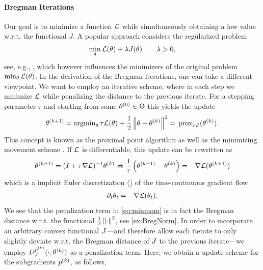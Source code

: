 \paragraph{Bregman Iterations} Our goal is to minimize a function $\mathcal{L}$ while simultaneously obtaining a low value w.r.t. the functional $J$. A popular approach considers the regularized problem
%
\begin{align*}
\min_\theta \mathcal{L}(\theta) + \lambda J(\theta)\qquad \lambda>0,
\end{align*}
%
see, e.g., \cite{tikhonov1943stability, combettes2008proximal,daubechies2004iterative,fadili2006sparse,figueiredo2007gradient,chambolle2004algorithm,chambolle2011first}, which however influences the minimizers of the original problem $\min_\theta \mathcal{L}(\theta)$. In the derivation of the Bregman iterations, one can take a different viewpoint. We want to employ an iterative scheme, where in each step we minimize $\mathcal{L}$ while penalizing the distance to the previous iterate. For a stepping parameter $\tau$ and starting from some $\theta^{(0)}\in\Theta$ this yields the update
%
\begin{align}\label{eq:minmom}
\theta^{(k+1)} = \operatorname{argmin}_\theta \tau\mathcal{L}(\theta) + \frac{1}{2}\left\|\theta -\theta^{(k)}\right\|^2 
= \,\mathrm{prox}_{\tau\mathcal{L}}(\theta^{(k)}).
\end{align}
%
This concept is known as the proximal point algorithm \cite{bregman1967relaxation} as well as the minimizing movement scheme \cite{de1993new}. If $\mathcal{L}$ is differentiable, this update can be rewritten as 
%
\begin{align*}
\param^\k{k+1} = (I+\tau\nabla\empLoss)^{-1}\param^\k{k}
%
\Leftrightarrow
%
\frac{1}{\tau}\left(\param^\k{k+1} - \param^\k{k}\right)
= -\nabla\empLoss(\param^\k{k+1})
\end{align*}
%
which is a implicit Euler discretization (\cite{euler1824institutionum}) of the time-continuous gradient flow
%
\begin{align*}
\partial_t \theta_t = -\nabla\mathcal{L}(\theta_t).
\end{align*}
%
%
We see that the penalization term in \cref{eq:minmom} is in fact the Bregman distance w.r.t. the functional $\frac{1}{2}\left\|\cdot\right\|^2$, see \cref{ex:BregNorm}. In order to incorporate an arbitrary convex functional $J$---and therefore allow each iterate to only slightly deviate w.r.t. the Bregman distance of $J$ to the previous iterate---we employ $D_J^{p^{(k)}}(\cdot, \theta^{(k)})$ as a penalization term. Here, we obtain a update scheme for the subgradients $p^{(k)}$, as follows,
